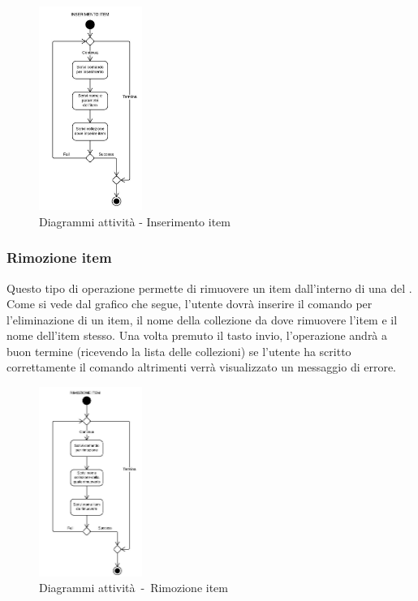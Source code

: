 \documentclass{scalatekids-article}
\begin{document}
\begin{figure}[H]
  \begin{center}
    \includegraphics[width=0.3\textwidth, keepaspectratio]{img/diagrammiAttivita/inserimentoItem.jpeg}
    \caption{Diagrammi attività - Inserimento item}
  \end{center}
\end{figure}

\subsubsection{Rimozione item}

Questo tipo di operazione permette di rimuovere un item dall'interno di una
 del . Come si vede dal grafico che segue, l'utente
dovrà inserire il comando per l'eliminazione di un item, il nome della
collezione da dove rimuovere l'item e il nome dell'item stesso. Una volta
premuto il tasto invio, l'operazione andrà a buon termine (ricevendo la lista
delle collezioni) se l'utente ha scritto correttamente il comando altrimenti
verrà visualizzato un messaggio di errore.

\begin{figure}[H]
  \begin{center}
    \includegraphics[width=0.3\textwidth, keepaspectratio]{img/diagrammiAttivita/rimozioneItem.jpeg}
    \caption{Diagrammi attività\ -\ Rimozione item}
  \end{center}
\end{figure}
\end{document}

